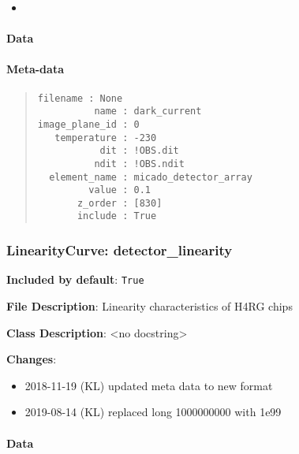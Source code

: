 \begin{itemize}
\item \end{itemize}


\paragraph{Data%
  \label{id7}%
}


\paragraph{Meta-data%
  \label{id8}%
}

\begin{quote}
\begin{alltt}
\begin{lstlisting}[frame=single]
      filename : None
          name : dark_current
image_plane_id : 0
   temperature : -230
           dit : !OBS.dit
          ndit : !OBS.ndit
  element_name : micado_detector_array
         value : 0.1
       z_order : [830]
       include : True
\end{lstlisting}
\end{alltt}
\end{quote}


\subsubsection{LinearityCurve: \textquotedbl{}detector\_linearity\textquotedbl{}%
  \label{linearitycurve-detector-linearity}%
}

\textbf{Included by default}: \texttt{True}

\textbf{File Description}: Linearity characteristics of H4RG chips

\textbf{Class Description}: <no docstring>

\textbf{Changes}:

\begin{itemize}
\item 2018-11-19 (KL) updated meta data to new format

\item 2019-08-14 (KL) replaced long 1000000000 with 1e99
\end{itemize}


\paragraph{Data%
  \label{id9}%
}

\begin{figure}[H]
\noindent{}\label{fig-detector-linearity}
\end{figure}


